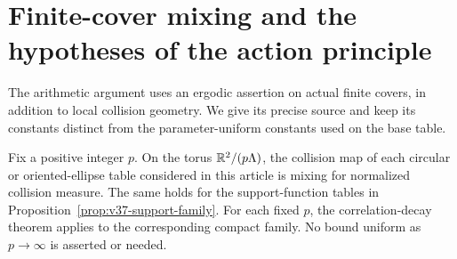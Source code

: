 \section{Finite-cover mixing and the hypotheses of the action principle}
\label{sec:v37-cover-inputs}
The arithmetic argument uses an ergodic assertion on actual finite
covers, in addition to local collision geometry. We give its precise
source and keep its constants distinct from the parameter-uniform
constants used on the base table.

\begin{proposition}
\label{prop:v37-finite-cover-mixing}
Fix a positive integer $p$. On the torus $\mathbb R^2/(p\Lambda)$, the
collision map of each circular or oriented-ellipse table considered
in this article is mixing for normalized collision measure. The same
holds for the support-function tables in
Proposition~\ref{prop:v37-support-family}. For each fixed $p$, the
correlation-decay theorem applies to the corresponding compact family.
No bound uniform as $p\to\infty$ is asserted or needed.
\end{proposition}
